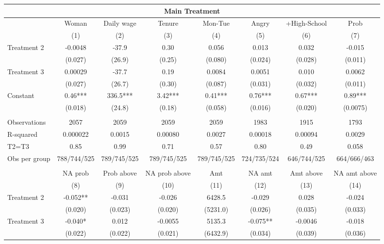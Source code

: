 \begin{tabular}{lccccccc}
\toprule
\multicolumn{8}{c}{Main Treatment} \\
\midrule
\midrule
      & Woman  & Daily wage & Tenure & Mon-Tue & Angry & +High-School & Prob \\
\midrule
\midrule
      & (1)   & (2)   & (3)   & (4)   & (5)   & (6)   & (7) \\
\midrule
Treatment 2 & -0.0048 & -37.9 & 0.30  & 0.056 & 0.013 & 0.032 & -0.015 \\
      & (0.027) & (26.9) & (0.25) & (0.080) & (0.024) & (0.028) & (0.011) \\
Treatment 3 & 0.00029 & -37.7 & 0.19  & 0.0084 & 0.0051 & 0.010 & 0.0062 \\
      & (0.027) & (26.7) & (0.30) & (0.087) & (0.031) & (0.032) & (0.011) \\
Constant  & 0.46*** & 336.5*** & 3.42*** & 0.41*** & 0.76*** & 0.67*** & 0.89*** \\
      & (0.018) & (24.8) & (0.18) & (0.058) & (0.016) & (0.020) & (0.0075) \\
      &       &       &       &       &       &       &  \\
\midrule
Observations & 2057  & 2059  & 2059  & 2059  & 1983  & 1915  & 1793 \\
R-squared & 0.000022 & 0.0015 & 0.00080 & 0.0027 & 0.00018 & 0.00094 & 0.0029 \\
T2=T3 & 0.85  & 0.99  & 0.71  & 0.57  & 0.80  & 0.49  & 0.058 \\
Obs per group & 788/744/525 & 789/745/525 & 789/745/525 & 789/745/525 & 724/735/524 & 646/744/525 & 664/666/463 \\
\midrule
\midrule
      &       &       &       &       &       &       &  \\
      & NA prob & Prob above & NA prob above & Amt   & NA amt & Amt above & NA amt above \\
\midrule
\midrule
      & (8)   & (9)   & (10)  & (11)  & (12)  & (13)  & (14) \\
\midrule
Treatment 2 & -0.052** & -0.031 & -0.026 & 6428.5 & -0.029 & 0.028 & -0.024 \\
      & (0.020) & (0.023) & (0.020) & (5231.0) & (0.026) & (0.035) & (0.033) \\
Treatment 3 & -0.040* & 0.012 & -0.0055 & 5135.3 & -0.075** & -0.0046 & -0.018 \\
      & (0.022) & (0.022) & (0.021) & (6432.9) & (0.034) & (0.039) & (0.036) \\

\end{tabular}
